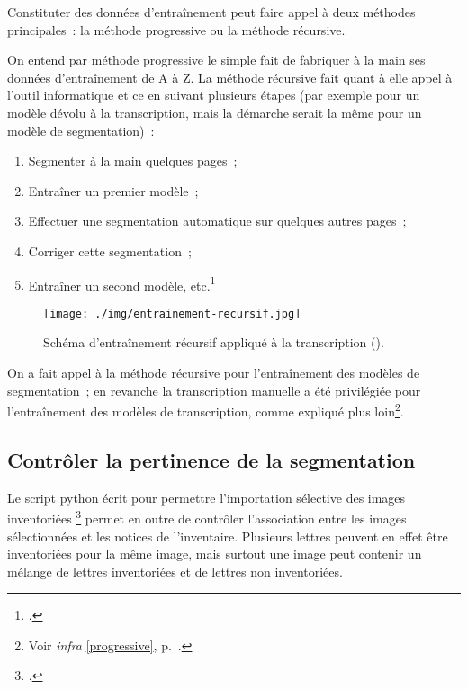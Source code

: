 \documentclass[a4paper,12pt,twoside]{book}
\begin{document}
	    		\label{recursive}
	    		Constituter des données d'entraînement peut faire appel à deux méthodes principales~: la méthode progressive ou la méthode récursive.
	    		
	    		On entend par méthode progressive le simple fait de fabriquer à la main ses données d'entraînement de A à Z. La méthode récursive fait quant à elle appel à l'outil informatique et ce en suivant plusieurs étapes (par exemple pour un modèle dévolu à la transcription, mais la démarche serait la même pour un modèle de \gls{segmentation})~:
	    		
	    		\begin{enumerate}
	    			\item Segmenter à la main quelques pages~;
	    			\item Entraîner un premier modèle~;
	    			\item Effectuer une \gls{segmentation} automatique sur quelques autres pages~;
	    			\item Corriger cette \gls{segmentation}~;
	    			\item Entraîner un second modèle, etc.\footcite{stokesEScriptoriumVREManuscript2021}
	    		\end{enumerate}
    			
    			\begin{figure}[!h]
    				\centering
    				\texttt{[image: ./img/entrainement-recursif.jpg]}
    				\caption{Schéma d'entraînement récursif appliqué à la transcription (\cite{pincheHTRPresentationProblematiques2021}).}
    				\label{fig}
    			\end{figure}
    			
    			On a fait appel à la méthode récursive pour l'entraînement des modèles de \gls{segmentation}~; en revanche la transcription manuelle a été privilégiée pour l'entraînement des modèles de transcription, comme expliqué plus loin\footnote{Voir \textit{infra} \ref{progressive}, p.~\pageref{progressive}.}.
	    		
	    	\subsection{Contrôler la pertinence de la \gls{segmentation}}
		    	\label{controle-segmentation-lettres-inventoriees}
	    		Le script python écrit pour permettre l'importation sélective des images inventoriées \footcite{biayDonneesImagesPy2022} permet en outre de contrôler l'association entre les images sélectionnées et les notices de l'inventaire. Plusieurs lettres peuvent en effet être inventoriées pour la même image, mais surtout une image peut contenir un mélange de lettres inventoriées et de lettres non inventoriées.
	    		
\end{document}
